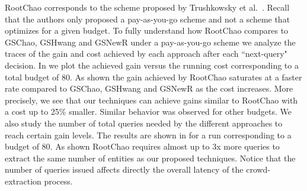 RootChao corresponds to the scheme proposed by Trushkowsky et al.~\cite{trushkowsky:2013}. Recall that the authors only proposed a pay-as-you-go scheme and not a scheme that optimizes for a given budget. To fully understand how RootChao compares to GSChao, GSHwang and GSNewR under a pay-as-you-go scheme we analyze the traces of the gain and cost achieved by each approach after each ``next-query" decision. In  we plot the achieved gain versus the running cost corresponding to a total budget of 80. As shown the gain achieved by RootChao saturates at a faster rate compared to GSChao, GSHwang and GSNewR as the cost increases. More precisely, we see that our techniques can achieve gains similar to RootChao with a cost up to 25\% smaller. Similar behavior was observed for other budgets. We also study the number of total queries needed by the different approaches to reach certain gain levels. The results are shown in  for a run corresponding to a budget of 80. As shown RootChao requires almost up to 3x more queries to extract the same number of entities as our proposed techniques. Notice that the number of queries issued affects directly the overall latency of the crowd-extraction process.

